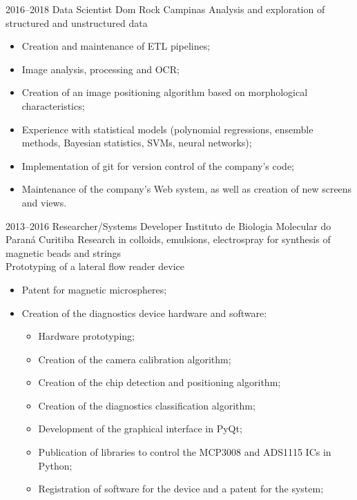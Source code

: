 \documentclass[11pt,a4paper,sans]{moderncv}        %
\begin{document}
\vspace{1em}
\cventry
{2016--2018}
{Data Scientist}
{Dom Rock}
{Campinas}{}
{Analysis and exploration of structured and unstructured data}
\begin{itemize}%
  \item Creation and maintenance of ETL pipelines;
  \item Image analysis, processing and OCR;
  \item Creation of an image positioning algorithm based on morphological characteristics;
  \item Experience with statistical models (polynomial regressions, ensemble methods, Bayesian statistics, SVMs, neural networks);
  \item Implementation of git for version control of the company's code;
  \item Maintenance of the company's Web system, as well as creation of new screens and views.
\end{itemize}

\vspace{1em}
\cventry
{2013--2016}
{Researcher/Systems Developer}
{Instituto de Biologia Molecular do Paraná}
{Curitiba}{}
{Research in colloids, emulsions, electrospray for synthesis of magnetic beads and strings\\
	Prototyping of a lateral flow reader device}
\begin{itemize}%
  \item Patent for magnetic microspheres;
  \item Creation of the diagnostics device hardware and software:
	      \begin{itemize}%
        \item Hardware prototyping;
        \item Creation of the camera calibration algorithm;
        \item Creation of the chip detection and positioning algorithm;
        \item Creation of the diagnostics classification algorithm;
        \item Development of the graphical interface in PyQt;
        \item Publication of libraries to control the MCP3008 and ADS1115 ICs in Python;
        \item Registration of software for the device and a patent for the system;
	      \end{itemize}
\end{itemize}
\end{document}
